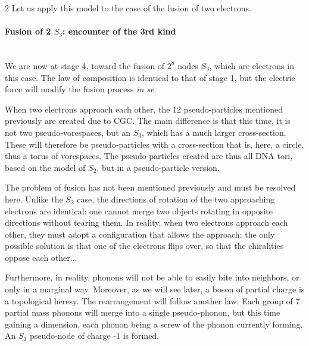\begin{multicols}{2}
	Let us apply this model to the case of the fusion of two electrons.
	
	\paragraph{Fusion of 2 $S_3$: encounter of the 3rd kind}~\\
	
	We are now at stage 4, toward the fusion of $2^8$ nodes $S_3$, which are electrons in this case. The law of composition is identical to that of stage 1, but the electric force will modify the fusion process \textit{in se}.
	
	When two electrons approach each other, the 12 pseudo-particles mentioned previously are created due to CGC. The main difference is that this time, it is not two pseudo-vorespaces, but an $S_3$, which has a much larger cross-section. These will therefore be pseudo-particles with a cross-section that is, here, a circle, thus a torus of vorespaces. The pseudo-particles created are thus all DNA tori, based on the model of $S_2$, but in a pseudo-particle version.
	
	The problem of fusion has not been mentioned previously and must be resolved here. Unlike the $S_2$ case, the directions of rotation of the two approaching electrons are identical: one cannot merge two objects rotating in opposite directions without tearing them. In reality, when two electrons approach each other, they must adopt a configuration that allows the approach: the only possible solution is that one of the electrons flips over, so that the chiralities oppose each other$\dots$
	
	Furthermore, in reality, phonons will not be able to easily bite into neighbors, or only in a marginal way. Moreover, as we will see later, a boson of partial charge is a topological heresy. The rearrangement will follow another law. Each group of 7 partial mass phonons will merge into a single pseudo-phonon, but this time gaining a dimension, each phonon being a screw of the phonon currently forming. An $S_3$ pseudo-node of charge -1 is formed.
	

\end{multicols}
